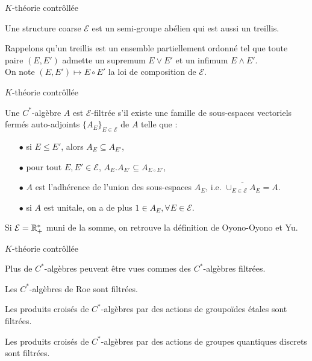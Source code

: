 
\begin{frame}{$K$-théorie contrôllée}

\begin{definitionfr}
Une structure coarse $\mathcal E$ est un semi-groupe abélien qui est aussi un treillis. \\
\end{definitionfr}

Rappelons qu'un treillis est un ensemble partiellement ordonné tel que toute paire $(E,E')$ admette un supremum $E\vee E'$ et un infimum $E\wedge E'$.\\

On note $(E,E')\mapsto E\circ E'$ la loi de composition de $\mathcal E$.
\end{frame}

\begin{frame}{$K$-théorie contrôllée}
\begin{definitionfr}
Une $C^*$-algèbre $A$ est $\mathcal E$-filtrée s'il existe une famille de sous-espaces vectoriels fermés auto-adjoints $\{A_E\}_{E\in\mathcal E}$ de $A$ telle que :
\begin{itemize}
\item[$\bullet$] si $E\leq E'$, alors $A_E\subseteq A_{E'}$,
\item[$\bullet$] pour tout $E,E'\in\mathcal E$, $A_E.A_{E'}\subseteq A_{E\circ E'}$,
\item[$\bullet$] $A$ est l'adhérence de l'union des sous-espaces $A_E$, i.e. $\overline{\cup_{E\in\mathcal E}A_E} = A$.
\item[$\bullet$] si $A$ est unitale, on a de plus $1\in A_E,\forall E\in\mathcal E$.
\end{itemize}
\end{definitionfr}

Si $\mathcal E = \mathbb R_+^*$ muni de la somme, on retrouve la définition de Oyono-Oyono et Yu. 
\end{frame}

\begin{frame}{$K$-théorie contrôllée}

Plus de $C^*$-algèbres peuvent être vues commes des $C^*$-algèbres filtrées.

\begin{exple}
Les $C^*$-algèbres de Roe sont filtrées.
\end{exple}

\begin{exple}
Les produits croisés de $C^*$-algèbres par des actions de groupoïdes étales sont filtrées.
\end{exple}

\begin{exple}
Les produits croisés de $C^*$-algèbres par des actions de groupes quantiques discrets sont filtrées.
\end{exple}

\end{frame}

